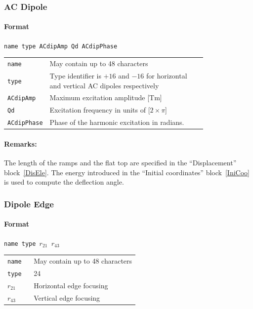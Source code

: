 \subsubsection{AC Dipole} \label{ACDIP}

\paragraph{Format} \texttt{name type ACdipAmp Qd ACdipPhase}

\bigskip
\begin{tabular}{@{}lp{0.8\linewidth}}
    \texttt{name} & May contain up to 48 characters \\
    \texttt{type} & Type identifier is $+16$ and $-16$ for horizontal and vertical AC dipoles respectively \\
    \texttt{ACdipAmp} & Maximum excitation amplitude [Tm] \\
    \texttt{Qd}   & Excitation frequency in units of [$2 \times \pi$] \\
    \texttt{ACdipPhase} & Phase of the harmonic excitation in radians.
\end{tabular}

\paragraph{Remarks:}
The length of the ramps and the flat top are specified in the ``Displacement'' block~\ref{DisEle}. The energy introduced in the ``Initial coordinates'' block~\ref{IniCoo} is used to compute the deflection angle.

\subsubsection{Dipole Edge}

\paragraph{Format} \texttt{name type $r_{21}$ $r_{43}$}

\bigskip
\begin{tabular}{@{}lp{0.8\linewidth}}
    \texttt{name} & May contain up to 48 characters \\
    \texttt{type} & 24 \\
    \texttt{$r_{21}$} & Horizontal edge focusing \\
    \texttt{$r_{43}$} & Vertical edge focusing
\end{tabular}
    

